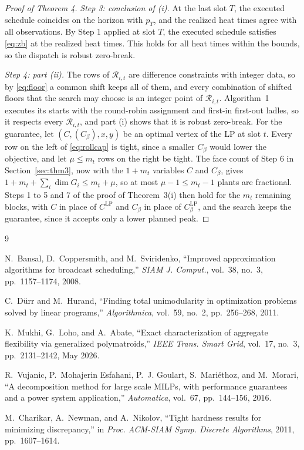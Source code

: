 \documentclass[11pt]{article}
\newcommand{\calR}{\mathcal{R}}
\newcommand{\CLP}{C^{\mathrm{LP}}}
\begin{document}
\begin{proof}[Proof of Theorem 4]
\emph{Step 3: conclusion of (i).} At the last slot $T$, the executed schedule coincides on the horizon with $p_T$, and
the realized heat times agree with all observations. By Step 1 applied at slot $T$, the executed schedule satisfies
\eqref{eq:zb} at the realized heat times. This holds for all heat times within the bounds, so the dispatch is robust
zero-break.

\emph{Step 4: part (ii).} The rows of $\calR_{i,t}$ are difference constraints with integer data, so by
\eqref{eq:floor} a common shift keeps all of them, and every combination of shifted floors that the search may choose is
an integer point of $\calR_{i,t}$. Algorithm~1 executes its starts with the round-robin assignment and first-in
first-out ladles, so it respects every $\calR_{i,t}$, and part (i) shows that it is robust zero-break. For the
guarantee, let $(C,(C_\beta),x,y)$ be an optimal vertex of the LP at slot $t$. Every row on the left of
\eqref{eq:rollcap} is tight, since a smaller $C_\beta$ would lower the objective, and let $\mu\le m_t$ rows on the
right be tight. The face count of Step 6 in Section~\ref{sec:thm3}, now with the $1+m_t$ variables $C$ and $C_\beta$,
gives $1+m_t+\sum_i\dim G_i\le m_t+\mu$, so at most $\mu-1\le m_t-1$ plants are fractional. Steps 1 to 5 and 7 of
the proof of Theorem~3(i) then hold for the $m_t$ remaining blocks, with $C$ in place of $\CLP$ and $C_\beta$ in place of
$\CLP_\beta$, and the search keeps the guarantee, since it accepts only a lower planned peak.
\end{proof}

\begin{thebibliography}{9}

N.~Bansal, D.~Coppersmith, and M.~Sviridenko, ``Improved approximation algorithms for broadcast scheduling,''
\emph{SIAM J. Comput.}, vol.~38, no.~3, pp.~1157--1174, 2008.

C.~D{\"u}rr and M.~Hurand, ``Finding total unimodularity in optimization problems solved by linear programs,''
\emph{Algorithmica}, vol.~59, no.~2, pp.~256--268, 2011.

K.~Mukhi, G.~Loho, and A.~Abate, ``Exact characterization of aggregate flexibility via generalized polymatroids,''
\emph{IEEE Trans. Smart Grid}, vol.~17, no.~3, pp.~2131--2142, May 2026.

R.~Vujanic, P.~Mohajerin Esfahani, P.~J. Goulart, S.~Mari{\'e}thoz, and M.~Morari, ``A decomposition method for large
scale MILPs, with performance guarantees and a power system application,'' \emph{Automatica}, vol.~67, pp.~144--156,
2016.

M.~Charikar, A.~Newman, and A.~Nikolov, ``Tight hardness results for minimizing discrepancy,'' in \emph{Proc. ACM-SIAM
Symp. Discrete Algorithms}, 2011, pp.~1607--1614.

\end{thebibliography}
\end{document}
